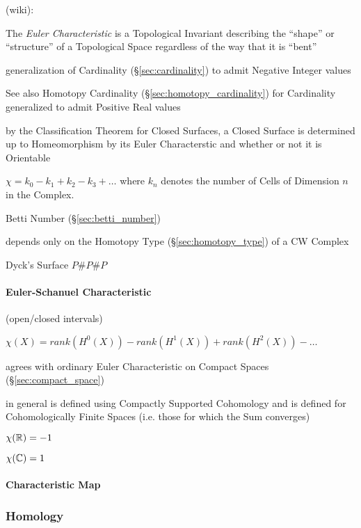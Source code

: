 (wiki):

The \emph{Euler Characteristic} is a Topological Invariant describing the
``shape'' or ``structure'' of a Topological Space regardless of the way that it
is ``bent''

generalization of Cardinality (\S\ref{sec:cardinality}) to admit
Negative Integer values

\fist See also Homotopy Cardinality (\S\ref{sec:homotopy_cardinality})
for Cardinality generalized to admit Positive Real values

by the Classification Theorem for Closed Surfaces, a Closed Surface is
determined up to Homeomorphism by its Euler Characterstic and whether or not it
is Orientable

$\chi = k_0 - k_1 + k_2 - k_3 + \ldots$ where $k_n$ denotes the number
of Cells of Dimension $n$ in the Complex.

Betti Number (\S\ref{sec:betti_number})

depends only on the Homotopy Type (\S\ref{sec:homotopy_type}) of a
CW Complex \cite{hatcher02}

Dyck's Surface $P \# P \# P$



\paragraph{Euler-Schanuel Characteristic}\label{sec:euler_schanuel}\hfill

(open/closed intervals) %

$\chi(X) = rank (H^0(X)) - rank (H^1(X)) + rank (H^2(X)) - \ldots$

agrees with ordinary Euler Characteristic on Compact Spaces
(\S\ref{sec:compact_space})

in general is defined using Compactly Supported Cohomology and is
defined for Cohomologically Finite Spaces (i.e. those for which the
Sum converges) %

$\chi(\mathbb{R}) = -1$

$\chi(\mathbb{C}) = 1$



\paragraph{Characteristic Map}\label{sec:characteristic_map}\hfill




\subsubsection{Homology}\label{sec:homology}

